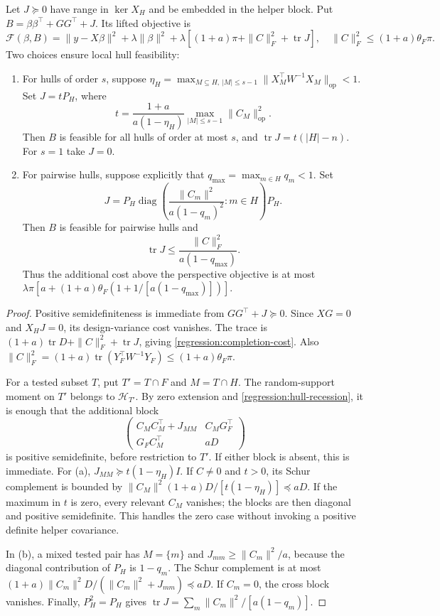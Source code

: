 \begin{lemma}\label{regression:completion}
Let $J\succeq0$ have range in $\ker X_H$ and be embedded in the
helper block. Put $B=\beta\beta^\top+GG^\top+J$.
Its lifted objective is
\begin{equation}\label{regression:completion-cost}
 \mathcal F(\beta,B)=
 \|y-X\beta\|^2+\lambda\|\beta\|^2+
 \lambda[(1+a)\pi+\|C\|_F^2+\operatorname{tr}J],
 \quad
 \|C\|_F^2\leq(1+a)\theta_F\pi.
\end{equation}
Two choices ensure local hull feasibility:
\begin{enumerate}[label=(\alph*)]
\item For hulls of order $s$, suppose
 $\eta_H=\max_{M\subseteq H,\ |M|\leq s-1}
             \|X_M^\top W^{-1}X_M\|_{\mathrm{op}}<1$.
 Set $J=tP_H$, where
 \[
 t=\frac{1+a}{a(1-\eta_H)}
           \max_{|M|\leq s-1}\|C_M\|_{\mathrm{op}}^2 .
 \]
 Then $B$ is feasible for all hulls of order at most $s$, and
 $\operatorname{tr}J=t(|H|-n)$. For $s=1$ take $J=0$.
\item For pairwise hulls, suppose explicitly that
 $q_{\max}=\max_{m\in H}q_m<1$.
 Set
 \[
 J=P_H\operatorname{diag}
       \left(\frac{\|C_m\|^2}{a(1-q_m)^2}:m\in H\right)P_H.
 \]
 Then $B$ is feasible for pairwise hulls and
 \[
 \operatorname{tr}J\leq\frac{\|C\|_F^2}{a(1-q_{\max})}.
 \]
 Thus the additional cost above the perspective objective is at most
 $\lambda\pi[a+(1+a)\theta_F(1+1/[a(1-q_{\max})])]$.
\end{enumerate}
\end{lemma}
\begin{proof}
Positive semidefiniteness is immediate from $GG^\top+J\succeq0$.
Since $XG=0$ and $X_HJ=0$, its design-variance cost vanishes.
The trace is $(1+a)\operatorname{tr}D+\|C\|_F^2+
\operatorname{tr}J$, giving \eqref{regression:completion-cost}.
Also
$\|C\|_F^2=(1+a)\operatorname{tr}(Y_F^\top W^{-1}Y_F)
\leq(1+a)\theta_F\pi$.

For a tested subset $T$, put $T'=T\cap F$ and $M=T\cap H$.
The random-support moment on $T'$ belongs to $\mathcal H_{T'}$.
By zero extension and \eqref{regression:hull-recession}, it is
enough that the additional block
\[
 \begin{pmatrix}
 C_MC_M^\top+J_{MM}&C_MG_F^\top\\
 G_FC_M^\top&aD
 \end{pmatrix}
\]
is positive semidefinite, before restriction to $T'$.
If either block is absent, this is immediate.
For (a), $J_{MM}\succeq t(1-\eta_H)I$.
If $C\ne0$ and $t>0$, its Schur complement is bounded by
$\|C_M\|^2(1+a)D/[t(1-\eta_H)]\preceq aD$.
If the maximum in $t$ is zero, every relevant $C_M$ vanishes;
the blocks are then diagonal and positive semidefinite.
This handles the zero case without invoking a positive definite
helper covariance.

In (b), a mixed tested pair has $M=\{m\}$ and
$J_{mm}\geq\|C_m\|^2/a$, because the diagonal contribution of
$P_H$ is $1-q_m$. The Schur complement is at most
$(1+a)\|C_m\|^2D/(\|C_m\|^2+J_{mm})\preceq aD$.
If $C_m=0$, the cross block vanishes.
Finally, $P_H^2=P_H$ gives
$\operatorname{tr}J=\sum_m\|C_m\|^2/[a(1-q_m)]$.
\end{proof}

